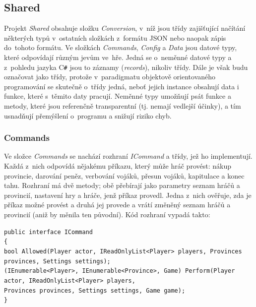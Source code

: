 \documentclass[a4paper,12pt]{article}
\def\CS{C\texttt{\#}}
\def\keyword #1{\color{keyword}#1\color{black}}
\begin{document}
\subsection{Shared}
Projekt \textit{Shared} obsahuje složku \textit{Conversion}, v~níž jsou třídy zajišťující načítání některých typů v~ostatních složkách z~formátu JSON nebo naopak zápis do~tohoto formátu. Ve složkách \textit{Commands}, \textit{Config} a \textit{Data} jsou datové typy, které odpovídají různým jevům ve~hře. Jedná se o~neměnné datové typy a z~pohledu jazyka \CS{} jsou to záznamy (\textit{records}), nikoliv třídy. Dále je však budu označovat jako třídy, protože v~paradigmatu objektově orientovaného programování se skutečně o~třídy jedná, neboť jejich instance obsahují data i funkce, které s~těmito daty pracují. \cite{oop} Neměnné typy umožňují psát funkce a metody, které jsou referenčně transparentní (tj. nemají vedlejší účinky), a tím usnadňují přemýšlení o~programu a snižují riziko chyb. \cite{immutable1}\cite{immutable2}

\subsubsection{Commands}
Ve složce \textit{Commands} se nachází rozhraní \textit{ICommand} a třídy, jež ho implementují. Každá z~nich odpovídá nějakému příkazu, který může hráč provést: nákup provincie, darování peněz, verbování vojáků, přesun vojáků, kapitulace a konec tahu. Rozhraní má dvě metody; obě přebírají jako parametry seznam hráčů a provincií, nastavení hry a hráče, jenž příkaz provedl. Jedna z~nich ověřuje, zda je příkaz možné provést a druhá jej provede a vrátí změněný seznam hráčů a provincií (aniž by měnila ten původní). Kód rozhraní vypadá takto:

\scriptsize\selectfont
\texttt{\keyword{public interface }ICommand}\\
\texttt{\{}\\
\hspace*{8mm}\texttt{\keyword{bool }Allowed(Player actor, IReadOnlyList<Player> players, Provinces provinces, Settings settings);}\\
\hspace*{8mm}\texttt{(IEnumerable<Player>, IEnumerable<Province>, Game) Perform(Player actor, IReadOnlyList<Player> players,}\\
\hspace*{48mm}\texttt{Provinces provinces, Settings settings, Game game);}\\
\texttt{\}}\normalsize
\end{document}
